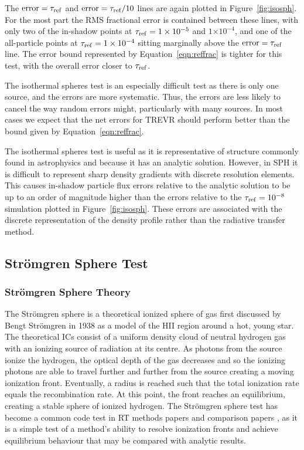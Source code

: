 \documentclass[fleq,usenatbib]{mnras}
\newcommand{\acro}{TREVR}
\providecommand{\e}[1]{\ensuremath{\times10^{#1}}}
\newcommand{\tr}{\tau_{\rm ref}}
\newcommand{\strom}{Str\"omgren}
\begin{document}
{The $\rm{error}=\tr$ and $\rm{error}=\tr/10$ lines are again plotted in 
Figure~\ref{fig:isosph}. For the most part the RMS fractional error is 
contained between these lines, with only two of the in-shadow points at 
$\tr=1\e{-5}$ and $1\e{-4}$,  and one of the all-particle points at  
$\tr=1\e{-4}$ sitting marginally above the $\rm{error}=\tr$ line. The error 
bound represented by Equation~\ref{eqn:reffrac} is tighter for this test, with 
the overall error closer to $\tr$.

The isothermal spheres test is an especially difficult test as there is only 
one source, and the errors are more systematic. Thus, the errors are less 
likely to cancel the way random errors might, particularly with many sources. 
In most cases we expect that the net errors for \acro{} should perform better 
than the bound given by Equation~\ref{eqn:reffrac}.

The isothermal spheres test is useful as it is representative of structure
commonly found in astrophysics and because it has an analytic solution. 
However, in SPH it is difficult to represent sharp density gradients with 
discrete resolution elements. This causes in-shadow particle flux errors 
relative to the analytic solution to be up to an order of magnitude higher 
than the errors relative to the $\tr = 10^{-8}$ simulation plotted in 
Figure~\ref{fig:isosph}. These errors are associated with the discrete 
representation of the density profile rather than the radiative transfer 
method.

\subsection{\strom{} Sphere Test} \label{stromgren}
\subsubsection{\strom{} Sphere Theory}
The \strom{} sphere is a theoretical ionized sphere of gas first discussed by 
Bengt \strom{} in 1938 \citep{stromgren39} as a model of the HII region around 
a hot, young star. The theoretical ICs consist of a uniform 
density cloud of neutral hydrogen gas with an ionizing source of radiation at 
its centre. As photons from the source ionize the hydrogen, the optical depth 
of the gas decreases and so the ionizing photons are able to travel further 
and further from the source creating a moving ionization front.  Eventually,
a radius is reached such that the total ionization rate equals the 
recombination rate.  At this point, the front reaches an equilibrium, creating 
a stable sphere of ionized hydrogen. The \strom{} sphere test has become a 
common code test in RT methods papers \citep{pawlikSchaye08, pawlikSchaye11, 
petkovaSpringel11} and comparison papers \citep{ilievEt06, ilievEt09}, as it 
is a simple test of a method's ability to resolve ionization fronts and 
achieve equilibrium behaviour that may be compared with analytic results.

}
\end{document}
